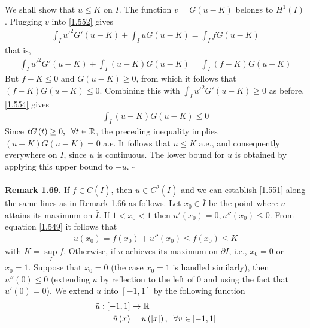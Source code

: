 \documentclass[a4paper,oneside]{book}
\numberwithin{equation}{chapter}
\begin{document}
We shall show that $u\le K$ on $I$. The function $v=G\left(u-K\right)$ belongs to $H^1\left(I\right)$. Plugging $v$ into \eqref{1.552} gives
\begin{align}
\int_I {u{'^2}G'\left( {u - K} \right)}  + \int_I {uG\left( {u - K} \right)}  = \int_I {fG\left( {u - K} \right)} 
\end{align}
that is,
\begin{align}
\label{1.554}
\int_I {u{'^2}G'\left( {u - K} \right)}  + \int_I {\left( {u - K} \right)G\left( {u - K} \right)}  = \int_I {\left( {f - K} \right)G\left( {u - K} \right)} 
\end{align}
But $f-K\le 0$ and $G\left(u-K\right)\ge 0$, from which it follows that ${\left( {f - K} \right)G\left( {u - K} \right)}\le 0$. Combining this with $\int_I {u{'^2}G'\left( {u - K} \right)}  \ge 0$ as before, \eqref{1.554} gives
\begin{align}
\int_I {\left( {u - K} \right)G\left( {u - K} \right)} \le 0
\end{align}
Since $tG\left(t\right)\ge 0,\hspace{0.2cm}\forall t\in \mathbb{R}$, the preceding inequality implies $\left( {u - K} \right)G\left( {u - K} \right) = 0$ a.e. It follows that $u\le K$ a.e., and consequently everywhere on $I$, since $u$ is continuous. The lower bound for $u$ is obtained by applying this upper bound to $-u$. \hfill $\square$\\
\\
\textbf{Remark 1.69.} If $f\in C\left(\bar I\right)$, then $u\in C^2\left(\bar I\right)$ and we can establish \eqref{1.551} along the same lines as in Remark 1.66 as follows. Let $x_0\in \bar I$ be the point where $u$ attains its maximum on $\bar I$. If  $1<x_0<1$ then $u'\left(x_0\right)=0,u''\left(x_0\right)\le 0$. From equation \eqref{1.549} it follows that
\begin{align}
u\left( {{x_0}} \right) = f\left( {{x_0}} \right) + u''\left( {{x_0}} \right) \le f\left( {{x_0}} \right) \le K
\end{align}
with $K = \mathop {\sup }\limits_I f$. Otherwise, if $u$ achieves its maximum on $\partial I$, i.e., $x_0=0$ or $x_0=1$. Suppose that $x_0=0$ (the case $x_0=1$ is handled similarly), then $u''\left(0\right)\le 0$ (extending $u$ by reflection to the left of 0 and using the fact that $u'\left(0\right)=0$). We extend $u$ into $\left[-1,1\right]$ by the following function
\begin{align}
\tilde u:\left[ { - 1,1} \right] &\to \mathbb{R}\\
\tilde u\left( x \right) &= u\left( {\left| x \right|} \right),\hspace{0.2cm}\forall v \in \left[ { - 1,1} \right]
\end{align}
\end{document}

